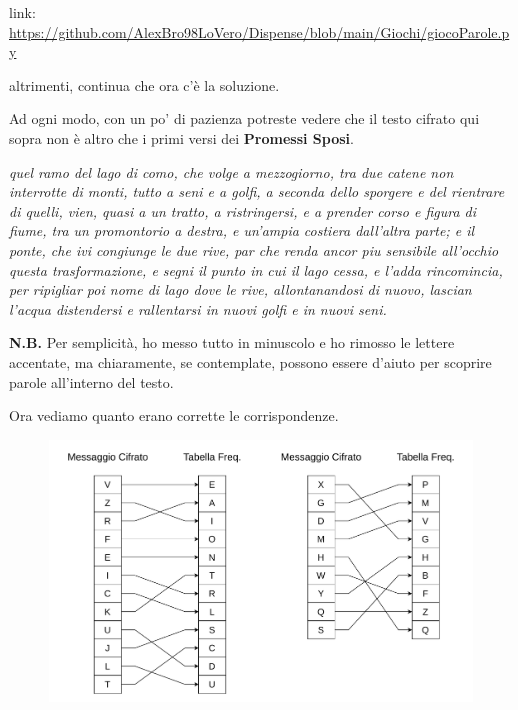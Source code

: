 \documentclass{report}
\begin{document}
link: \url{https://github.com/AlexBro98LoVero/Dispense/blob/main/Giochi/giocoParole.py}

altrimenti, continua che ora c'è la soluzione.

\newpage
Ad ogni modo, con un po' di pazienza potreste vedere che il testo cifrato qui sopra non è altro che i primi versi dei \textbf{Promessi Sposi}.

\vspace{0.2cm}
\textit{quel ramo del lago di como, che volge a mezzogiorno, tra due catene non interrotte di monti, tutto a seni e a golfi, a seconda dello sporgere e del rientrare di quelli, vien, quasi a un tratto, a ristringersi, e a prender corso e figura di fiume, tra un promontorio a destra, e un’ampia costiera dall’altra parte; e il ponte, che ivi congiunge le due rive, par che renda ancor piu sensibile all’occhio questa trasformazione, e segni il punto in cui il lago cessa, e l’adda rincomincia, per ripigliar poi nome di lago dove le rive, allontanandosi di nuovo, lascian l’acqua distendersi e rallentarsi in nuovi golfi e in nuovi seni. }
\vspace{0.2cm}


\textbf{N.B.} Per semplicità, ho messo tutto in minuscolo e ho rimosso le lettere accentate, ma chiaramente, se contemplate, possono essere d'aiuto per scoprire parole all'interno del testo.

\vspace{0.2cm}

Ora vediamo quanto erano corrette le corrispondenze.


\begin{figure}[h]

    \centering
    \includegraphics[width=\linewidth]{logos/1_5_cripto.pdf}

\end{figure}
\end{document}
